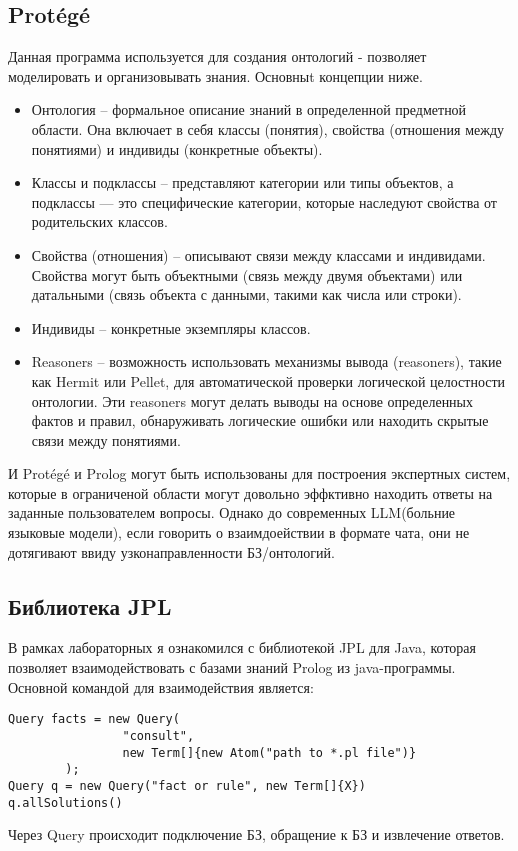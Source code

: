 \documentclass{article}
\begin{document}
\subsection{Protégé}
Данная программа используется для создания онтологий - позволяет моделировать и организовывать знания.
Основныt концепции ниже.
\begin{itemize}
\item Онтология -- формальное описание знаний в определенной предметной области. Она включает в себя классы (понятия), свойства (отношения между понятиями) и индивиды (конкретные объекты).
\item Классы и подклассы -- представляют категории или типы объектов, а подклассы — это специфические категории, которые наследуют свойства от родительских классов.
\item Свойства (отношения) -- описывают связи между классами и индивидами. Свойства могут быть объектными (связь между двумя объектами) или датальными (связь объекта с данными, такими как числа или строки).
\item Индивиды -- конкретные экземпляры классов.
\item Reasoners --  возможность использовать механизмы вывода (reasoners), такие как Hermit или Pellet, для автоматической проверки логической целостности онтологии. Эти reasoners могут делать выводы на основе определенных фактов и правил, обнаруживать логические ошибки или находить скрытые связи между понятиями.
\end{itemize}
И Protégé и Prolog могут быть использованы для построения экспертных систем, которые в ограниченой области могут довольно эффктивно находить ответы на заданные пользователем вопросы. Однако до современных LLM(больние языковые модели), если говорить о взаимдоействии в формате чата, они не дотягивают ввиду узконаправленности БЗ/онтологий.
\subsection{Библиотека JPL}
В рамках лабораторных я ознакомился с библиотекой JPL для Java, которая позволяет взаимодействовать с базами знаний Prolog из java-программы. Основной командой для взаимодействия является:
\begin{lstlisting}
Query facts = new Query(
                "consult",
                new Term[]{new Atom("path to *.pl file")}
        );
Query q = new Query("fact or rule", new Term[]{X})
q.allSolutions()
\end{lstlisting}
Через Query происходит подключение БЗ, обращение к БЗ и извлечение ответов.
\end{document}
